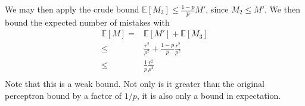 \documentclass{article}
\newcommand{\E}[0]{\mathbb{E}}
\begin{document}
We may then apply the crude bound $\E[M_3] \leq  \frac{1-p}{p}
M'$, since $M_2 \leq M'$. We then bound the expected number of mistakes with
\begin{align*}
\E[M]  =  & \E[M'] + \E[M_3] \\
\leq &  \frac{r^2}{\rho^2} + \frac{1-p}{p}\frac{r^2}{\rho^2} \\
\leq  & \frac{1}{p}\frac{r^2}{\rho^2} \\
\end{align*}
Note that this is a weak bound.  Not only is it greater than the
original perceptron bound by a factor of $1/p$, it is also only a
bound in expectation.
\end{document}
